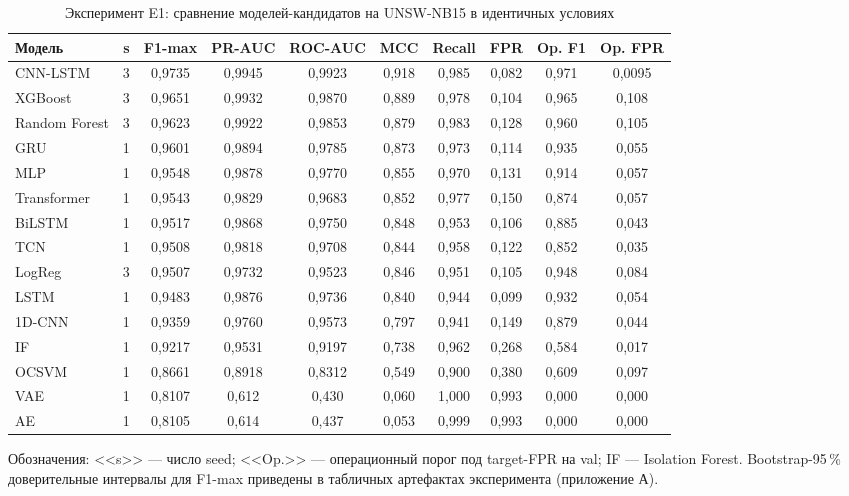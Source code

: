 \begin{table}[H]
\caption{Эксперимент E1: сравнение моделей-кандидатов на UNSW-NB15
в идентичных условиях}
\label{tab:E1-summary}
\centering
\setlength{\tabcolsep}{3pt}
\footnotesize
\begin{tabular}{|l|c|c|c|c|c|c|c|c|c|}
\hline
Модель & s & F1-max & PR-AUC & ROC-AUC & MCC & Recall & FPR & Op. F1 & Op. FPR \\
\hline
CNN-LSTM      & 3 & 0,9735 & 0,9945 & 0,9923 & 0,918 & 0,985 & 0,082 & 0,971 & 0,0095 \\
\hline
XGBoost                & 3 & 0,9651 & 0,9932 & 0,9870 & 0,889 & 0,978 & 0,104 & 0,965 & 0,108 \\
\hline
Random Forest          & 3 & 0,9623 & 0,9922 & 0,9853 & 0,879 & 0,983 & 0,128 & 0,960 & 0,105 \\
\hline
GRU                    & 1 & 0,9601 & 0,9894 & 0,9785 & 0,873 & 0,973 & 0,114 & 0,935 & 0,055 \\
\hline
MLP                    & 1 & 0,9548 & 0,9878 & 0,9770 & 0,855 & 0,970 & 0,131 & 0,914 & 0,057 \\
\hline
Transformer            & 1 & 0,9543 & 0,9829 & 0,9683 & 0,852 & 0,977 & 0,150 & 0,874 & 0,057 \\
\hline
BiLSTM                 & 1 & 0,9517 & 0,9868 & 0,9750 & 0,848 & 0,953 & 0,106 & 0,885 & 0,043 \\
\hline
TCN                    & 1 & 0,9508 & 0,9818 & 0,9708 & 0,844 & 0,958 & 0,122 & 0,852 & 0,035 \\
\hline
LogReg                 & 3 & 0,9507 & 0,9732 & 0,9523 & 0,846 & 0,951 & 0,105 & 0,948 & 0,084 \\
\hline
LSTM                   & 1 & 0,9483 & 0,9876 & 0,9736 & 0,840 & 0,944 & 0,099 & 0,932 & 0,054 \\
\hline
1D-CNN                 & 1 & 0,9359 & 0,9760 & 0,9573 & 0,797 & 0,941 & 0,149 & 0,879 & 0,044 \\
\hline
IF                     & 1 & 0,9217 & 0,9531 & 0,9197 & 0,738 & 0,962 & 0,268 & 0,584 & 0,017 \\
\hline
OCSVM                  & 1 & 0,8661 & 0,8918 & 0,8312 & 0,549 & 0,900 & 0,380 & 0,609 & 0,097 \\
\hline
VAE                    & 1 & 0,8107 & 0,612  & 0,430  & 0,060 & 1,000 & 0,993 & 0,000 & 0,000 \\
\hline
AE                     & 1 & 0,8105 & 0,614  & 0,437  & 0,053 & 0,999 & 0,993 & 0,000 & 0,000 \\
\hline
\end{tabular}

\smallskip
\footnotesize
Обозначения: <<s>> --- число seed; <<Op.>> --- операционный порог
под target-FPR на val; IF --- Isolation Forest. Bootstrap-95\,\%
доверительные интервалы для F1-max приведены в табличных
артефактах эксперимента (приложение А).
\end{table}

